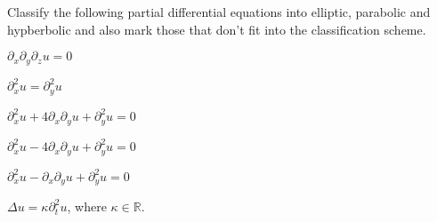 Classify the following partial differential equations into elliptic,
parabolic and hypberbolic and also mark those that don't fit into
the classification scheme.
\begin{teilaufgaben}
\item $\partial_x\partial_y\partial_z u=0$
\item $\partial_x^2u=\partial_y^2u$
\item $\partial_x^2u+4\partial_x\partial_yu+\partial_y^2u=0$
\item $\partial_x^2u-4\partial_x\partial_yu+\partial_y^2u=0$
\item $\partial_x^2u-\partial_x\partial_yu+\partial_y^2u=0$
\item $\Delta u=\kappa\partial_t^2u$, where $\kappa\in \mathbb R$.
\end{teilaufgaben}

